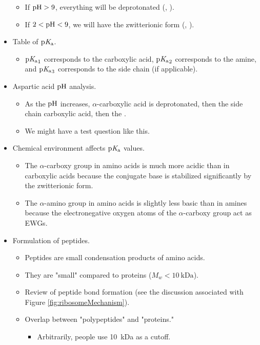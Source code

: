 \documentclass[../notes.tex]{subfiles}
\begin{document}
\begin{itemize}
\begin{itemize}
        \item If $\operatorname{pH}>9$, everything will be deprotonated (, ).
        \item If $2<\operatorname{pH}<9$, we will have the zwitterionic form (, ).
    \end{itemize}
    \item Table of $\operatorname{p\textit{K}_a}$.
    \begin{itemize}
        \item $\operatorname{p\textit{K}_a}_1$ corresponds to the carboxylic acid, $\operatorname{p\textit{K}_a}_2$ corresponds to the amine, and $\operatorname{p\textit{K}_a}_3$ corresponds to the side chain (if applicable).
    \end{itemize}
    \item Aspartic acid $\operatorname{pH}$ analysis.
    \begin{itemize}
        \item As the $\operatorname{pH}$ increases, $\alpha$-carboxylic acid is deprotonated, then the side chain carboxylic acid, then the .
        \item We might have a test question like this.
    \end{itemize}
    \item Chemical environment affects $\operatorname{p\textit{K}_a}$ values.
    \begin{itemize}
        \item The $\alpha$-carboxy group in amino acids is much more acidic than in carboxylic acids because the conjugate base is stabilized significantly by the zwitterionic form.
        \item The $\alpha$-amino group in amino acids is slightly less basic than in amines because the electronegative oxygen atoms of the $\alpha$-carboxy group act as EWGs.
    \end{itemize}
    \item Formulation of peptides.
    \begin{itemize}
        \item Peptides are small condensation products of amino acids.
        \item They are "small" compared to proteins ($M_w<\SI{10}{\kilo\dalton}$).
        \item Review of peptide bond formation (see the discussion associated with Figure \ref{fig:ribosomeMechanism}).
        \item Overlap between "polypeptides" and "proteins."
        \begin{itemize}
            \item Arbitrarily, people use \SI{10}{\kilo\dalton} as a cutoff.

\end{itemize}
\end{itemize}
\end{itemize}
\end{document}

